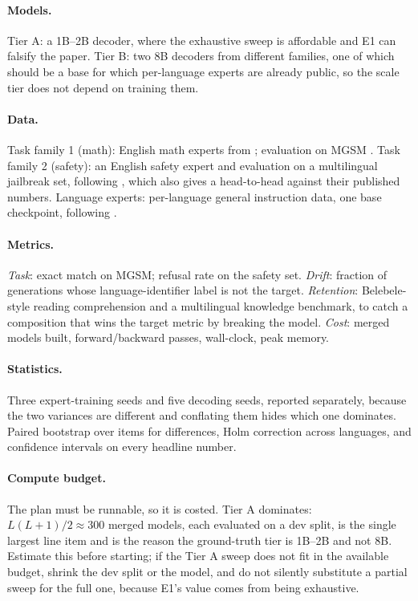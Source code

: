 \documentclass[10pt]{article}
\theoremstyle{plain}
\theoremstyle{definition}
\theoremstyle{remark}
\begin{document}
\paragraph{Models.} Tier A: a 1B--2B decoder, where the exhaustive sweep is
affordable and E1 can falsify the paper. Tier B: two 8B decoders from different
families, one of which should be a base for which per-language experts are
already public, so the scale tier does not depend on training them.

\paragraph{Data.} Task family 1 (math): English math experts from
\citep{yu2024metamath, cobbe2021gsm8k}; evaluation on MGSM \citep{shi2022mgsm}.
Task family 2 (safety): an English safety expert and evaluation on a multilingual
jailbreak set, following \citet{shin2026safetyswap}, which also gives a
head-to-head against their published numbers. Language experts: per-language
general instruction data, one base checkpoint, following
\citet{bandarkar2025layerswap}.

\paragraph{Metrics.} \emph{Task}: exact match on MGSM; refusal rate on the safety
set. \emph{Drift}: fraction of generations whose language-identifier label
\citep{grave2018fasttext} is not the target. \emph{Retention}: Belebele-style
reading comprehension and a multilingual knowledge benchmark, to catch a
composition that wins the target metric by breaking the model. \emph{Cost}:
merged models built, forward/backward passes, wall-clock, peak memory.

\paragraph{Statistics.} Three expert-training seeds and five decoding seeds,
reported separately, because the two variances are different and conflating them
hides which one dominates. Paired bootstrap over items for differences, Holm
correction across languages, and confidence intervals on every headline number.

\paragraph{Compute budget.} The plan must be runnable, so it is costed. Tier A
dominates: $L(L{+}1)/2 \approx 300$ merged models, each evaluated on a dev split,
is the single largest line item and is the reason the ground-truth tier is 1B--2B
and not 8B. Estimate this before starting; if the Tier A sweep does not fit in
the available budget, shrink the dev split or the model, and do not silently
substitute a partial sweep for the full one, because E1's value comes from being
exhaustive.
\end{document}
